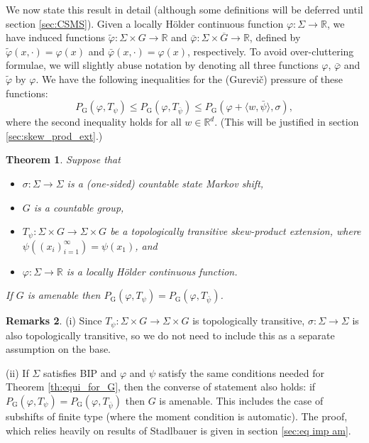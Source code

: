 \documentclass[11pt,letterpaper]{amsart}
\newtheorem{theorem}{Theorem}
\theoremstyle{definition}
\newtheorem{remarks}[theorem]{Remarks}
\numberwithin{equation}{section}
\numberwithin{theorem}{section}
\def\R{\mathbb{R}}
\def\vp{\varphi}
\def\R{\mathbb R}
\def\PG{P_{\mathrm{G}}}
\begin{document}
We now state this result in detail (although some definitions will be deferred until 
section \ref{sec:CSMS}).
Given a locally  H\"older continuous function $\vp : \Sigma \to \R$, we have induced functions
$\tilde \vp : \Sigma \times G \to \R$ and $\bar \vp : \Sigma \times \overline G \to \R$, defined by
$\tilde \vp(x,\cdot) =\vp(x)$ and $\bar \vp(x,\cdot)=\vp(x)$, respectively.
To avoid over-cluttering formulae, we will slightly abuse notation by denoting all three functions
$\vp$, $\bar \vp$ and $\tilde \vp$ by $\vp$.
We have the following inequalities for the (Gurevi\v{c}) pressure of these functions:
\begin{equation}\label{eq:gur_pres_inequalities}
\PG(\vp,T_\psi) \le \PG(\vp,T_{\bar \psi}) \le \PG(\vp + \langle w,\bar \psi \rangle,\sigma),
\end{equation}
where the second inequality holds for all $w \in \R^d$. (This will be justified in section \ref{sec:skew_prod_ext}.)






\begin{theorem}\label{th:main}
Suppose that 
\begin{itemize}
\item
$\sigma : \Sigma \to \Sigma$ is a (one-sided) 
countable state Markov shift, 
\item
$G$ is a countable group,
\item 
$T_\psi : \Sigma \times G \to \Sigma \times G$ be a topologically transitive skew-product extension,
where $\psi((x_i)_{i=1}^\infty)=\psi(x_1)$, and
\item
$\vp : \Sigma \to \mathbb R$ is a locally H\"older continuous function.
\end{itemize}
If $G$ is amenable then
$\PG(\vp,T_\psi) = \PG(\vp,T_{\bar \psi})$.
\end{theorem}

\begin{remarks}\label{rem:remark to main}
(i) Since $T_\psi : \Sigma \times G \to \Sigma \times G$ is topologically transitive, $\sigma :\Sigma \to \Sigma$ is also topologically transitive, so we do not need to include this as a separate assumption on the base.


\noindent
(ii) If $\Sigma$ satisfies BIP
and $\vp$ and $\psi$ satisfy the same conditions needed for Theorem \ref{th:equi_for_G},
then the converse of statement also holds:
if $\PG(\vp,T_\psi) = \PG(\vp,T_{\bar \psi})$ then $G$ is amenable. This includes the case of subshifts of finite type (where the moment condition is automatic). The proof, which relies heavily on results
of Stadlbauer \cite{Stadlbauer2013} is given in section \ref{sec:eq imp am}.
\end{remarks}
\end{document}
